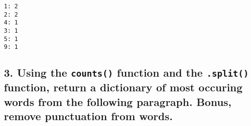 \documentclass[11pt]{article}
\begin{document}
    \begin{Verbatim}[commandchars=\\\{\}]
1: 2
2: 2
4: 1
3: 1
5: 1
9: 1

    \end{Verbatim}

    \subsection{\texorpdfstring{3. Using the \texttt{counts()} function and
the \texttt{.split()} function, return a dictionary of most occuring
words from the following paragraph. Bonus, remove punctuation from
words.}{3. Using the counts() function and the .split() function, return a dictionary of most occuring words from the following paragraph. Bonus, remove punctuation from words.}}\label{using-the-counts-function-and-the-.split-function-return-a-dictionary-of-most-occuring-words-from-the-following-paragraph.-bonus-remove-punctuation-from-words.}
\end{document}

